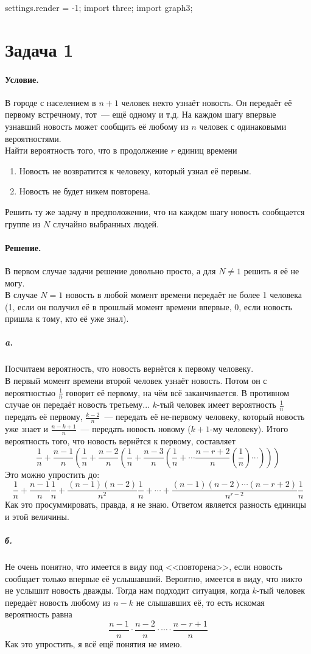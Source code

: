 \documentclass{article}
\begin{document}
    \begin{asydef}
        settings.render = -1;
        import three;
        import graph3;
    \end{asydef}
    \section{Задача 1}
    \paragraph{Условие.}
    В городе с населением в $n+1$ человек некто узнаёт новость. Он передаёт её первому встречному, тот~--- ещё одному и т.д. На каждом шагу впервые узнавший новость может сообщить её любому из $n$ человек  с одинаковыми вероятностями.\\
    Найти вероятность того, что в продолжение $r$ единиц времени
    \begin{enumerate}
        \item Новость не возвратится к человеку, который узнал её первым.
        \item Новость не будет никем повторена.
    \end{enumerate}
    Решить ту же задачу в предположении, что на каждом шагу новость сообщается группе из $N$ случайно выбранных людей.
    \paragraph{Решение.}
    В первом случае задачи решение довольно просто, а для $N\neq1$ решить я её не могу.\\
    В случае $N=1$ новость в любой момент времени передаёт не более 1 человека (1, если он получил её в прошлый момент времени впервые, 0, если новость пришла к тому, кто её уже знал).
    \subparagraph{a.}
    Посчитаем вероятность, что новость вернётся к первому человеку.\\
    В первый момент времени второй человек узнаёт новость. Потом он с вероятностью $\frac1n$ говорит её первому, на чём всё заканчивается. В противном случае он передаёт новость третьему... $k$-тый человек имеет вероятность $\frac1n$ передать её первому, $\frac{k-2}n$~--- передать её не-первому человеку, который новость уже знает и $\frac{n-k+1}n$~--- передать новость новому ($k+1$-му человеку). Итого вероятность того, что новость вернётся к первому, составляет
    $$
    \frac1n+\frac{n-1}n\left(\frac1n+\frac{n-2}n\left(\frac1n+\frac{n-3}n\left(\frac1n+\cdots\frac{n-r+2}n\left(\frac1n\right)\cdots\right)\right)\right)
    $$
    Это можно упростить до:
    $$
    \frac1n+\frac{n-1}n\frac1n+\frac{(n-1)(n-2)}{n^2}\frac1n+\cdots+\frac{(n-1)(n-2)\cdots(n-r+2)}{n^{r-2}}\frac1n
    $$
    Как это просуммировать, правда, я не знаю. Ответом является разность единицы и этой величины.
    \subparagraph{б.}
    Не очень понятно, что имеется в виду под <<повторена>>, если новость сообщает только впервые её услышавший. Вероятно, имеется в виду, что никто не услышит новость дважды. Тогда нам подходит ситуация, когда $k$-тый человек передаёт новость любому из $n-k$ не слышавших её, то есть искомая вероятность равна
    $$
    \frac{n-1}n\cdot\frac{n-2}n\cdot\cdots\cdot\frac{n-r+1}n
    $$
    Как это упростить, я всё ещё понятия не имею.
\end{document}
